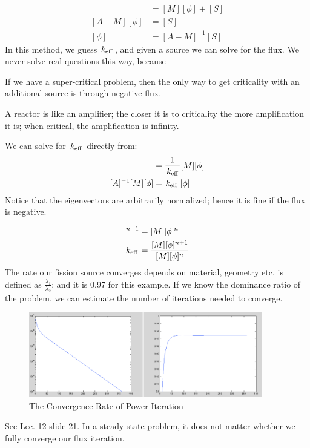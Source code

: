 \documentclass{school-22.211-notes}
\begin{document}
\begin{align}
[A] [\phi] &= [M] [\phi] + [S] \\
[A - M ] [\phi] &= [S] \\
[\phi] &= [A - M]^{-1} [S]
\end{align}
In this method, we guess $\left. k_{\mathrm{eff}} \right.$, and given a source we can solve for the flux. We never solve real questions this way, because 

If we have a super-critical problem, then the only way to get criticality with an additional source is through negative flux. 

A reactor is like an amplifier; the closer it is to criticality the more amplification it is; when critical, the amplification is infinity. 


We can solve for $\left. k_{\mathrm{eff}} \right.$ directly from: 
\begin{align}
[A] [\phi] &= \frac{1}{\keff} [M] [\phi] \\
[A]^{-1} [M] [\phi] &= \keff [\phi]
\end{align}
Notice that the eigenvectors are arbitrarily normalized; hence it is fine if the flux is negative. 



\begin{align}
[A] [\phi]^{n+1} &= [M] [\phi]^n \\
\keff &= \frac{[M][\phi]^{n+1} }{[M] [\phi]^n} 
\end{align}
The rate our fission source converges depends on material, geometry etc.  is defined as $\frac{\lambda_1}{\lambda_2}$; and it is 0.97 for this example. If we know the dominance ratio of the problem, we can estimate the number of iterations needed to converge. 
\begin{figure}
  \centering
  \includegraphics[width=4in]{images/dfs/power-iteration-convergence.png}
  \caption{The Convergence Rate of Power Iteration}
\end{figure}

See Lec. 12 slide 21. In a steady-state problem, it does not matter whether we fully converge our flux iteration. 
\end{document}
